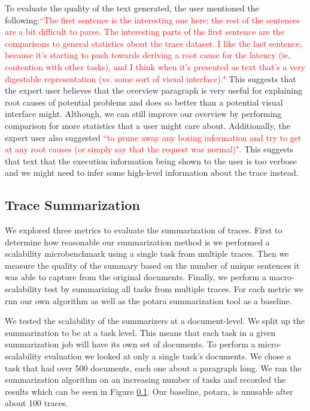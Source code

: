 To evaluate the quality of the text generated, the user mentioned the following:\textcolor{red}{``The first sentence is the interesting one here; the rest of the sentences are a bit difficult to parse.
The interesting parts of the first sentence are the comparisons to general statistics about the trace dataset.  I like the last sentence, because it's starting to push towards deriving a 
root cause for the latency (ie, contention with other tasks), and I think when it's presented as text that's a very digestable representation (vs. some sort of visual interface)."}
This suggests that the expert user believes that the overview paragraph is very useful for explaining root causes of potential problems and does so better than a potential
visual interface might. Although, we can still improve our overview by performing comparison for more statistics that a user might care about. Additionally,
the expert user also suggested \textcolor{red}{``to prune away any boring information and try to get at any root causes (or simply say that the request was normal)"}. This suggests
that text that the execution information being shown to the user is too verbose and we might need to infer some high-level information about the trace instead.

\subsection{Trace Summarization}

We explored three metrics to evaluate the summarization of traces. 
First to determine how reasonable our summarization method is we performed a scalability microbenchmark using a single task from multiple traces. 
Then we measure the quality of the summary based on the number of unique sentences it was able to capture from the original documents.
Finally, we perform a macro-scalability test by summarizing all tasks from multiple traces. For each metric we run our own algorithm as well as the potara summarization tool 
as a baseline.

 We tested the scalability of the summarizers at a document-level. We split up the summarization to be at a task level. 
This means that each task in a given summarization job will have its own set of documents. 
To perform a micro-scalability evaluation we looked at only a single task's documents. We chose a task that had over 500 documents, each one about a paragraph long. 
We ran the summarization algorithm on an increasing number of tasks and recorded the results which can be seen in Figure \ref{}. Our baseline, potara, is unusable after
about 100 traces. 

